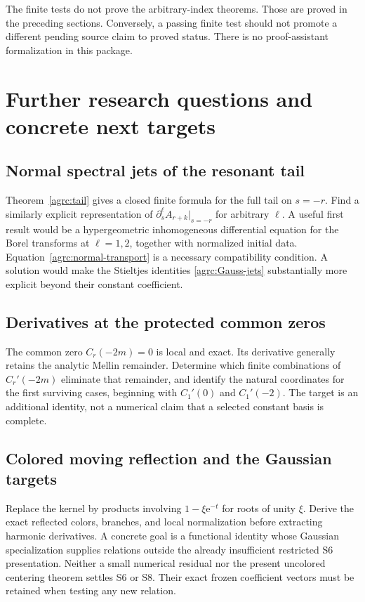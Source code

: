 \documentclass[11pt]{article}
\numberwithin{equation}{section}
\theoremstyle{definition}\newtheorem{definition}[theorem]{Definition}
\theoremstyle{remark}\newtheorem{remark}[theorem]{Remark}
\newcommand{\e}{\mathrm e}
\begin{document}
The finite tests do not prove the arbitrary-index theorems. Those are
proved in the preceding sections. Conversely, a passing finite test
should not promote a different pending source claim to proved status.
There is no proof-assistant formalization in this package.

\section{Further research questions and concrete next targets}
\label{agrc:future}

\subsection{Normal spectral jets of the resonant tail}
Theorem~\ref{agrc:tail} gives a closed finite formula for the full tail
on $s=-r$. Find a similarly explicit representation of
$\partial_s^\ell A_{r+k}|_{s=-r}$ for arbitrary $\ell$. A useful first
result would be a hypergeometric inhomogeneous differential equation
for the Borel transforms at $\ell=1,2$, together with normalized initial
data. Equation~\eqref{agrc:normal-transport} is a necessary compatibility
condition. A solution would make the Stieltjes identities
\eqref{agrc:Gauss-jets} substantially more explicit beyond their
constant coefficient.

\subsection{Derivatives at the protected common zeros}
The common zero $C_r(-2m)=0$ is local and exact. Its derivative generally
retains the analytic Mellin remainder. Determine which finite combinations
of $C_r'(-2m)$ eliminate that remainder, and identify the natural
coordinates for the first surviving cases, beginning with $C_1'(0)$
and $C_1'(-2)$. The target is an additional identity, not a numerical
claim that a selected constant basis is complete.

\subsection{Colored moving reflection and the Gaussian targets}
Replace the kernel by products involving $1-\xi\e^{-t}$ for roots of
unity $\xi$. Derive the exact reflected colors, branches, and local
normalization before extracting harmonic derivatives. A concrete goal
is a functional identity whose Gaussian specialization supplies relations
outside the already insufficient restricted S6 presentation. Neither a
small numerical residual nor the present uncolored centering theorem
settles S6 or S8. Their exact frozen coefficient vectors must be retained
when testing any new relation.
\end{document}
